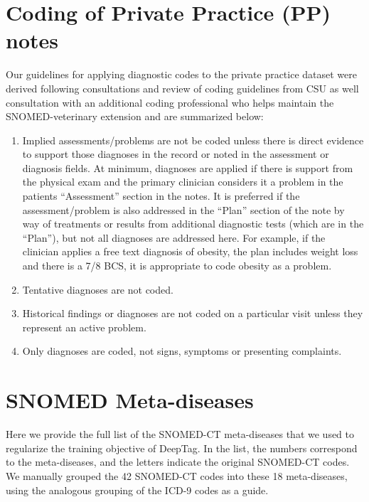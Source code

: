 \documentclass{article}[11pt,oneside]
\begin{document}
\section{Coding of Private Practice (PP) notes}

Our guidelines for applying diagnostic codes to the private practice dataset were derived following consultations and review of coding guidelines from CSU as well consultation with an additional coding professional who helps maintain the SNOMED-veterinary extension and are summarized below:

\begin{enumerate}

\item Implied assessments/problems are not be coded unless there is direct evidence to support those diagnoses in the record or noted in the assessment or diagnosis fields. At minimum, diagnoses are applied if there is support from the physical exam and the primary clinician considers it a problem in the patients “Assessment” section in the notes.  It is preferred if the assessment/problem is also addressed in the “Plan” section of the note by way of treatments or results from additional diagnostic tests (which are in the “Plan”), but not all diagnoses are addressed here. For example, if the clinician applies a free text diagnosis of obesity, the plan includes weight loss and there is a 7/8 BCS, it is appropriate to code obesity as a problem.

\item Tentative diagnoses are not coded.

\item Historical findings or diagnoses are not coded on a particular visit unless they represent an active problem.

\item Only diagnoses are coded, not signs, symptoms or presenting complaints.
\end{enumerate}

\section{SNOMED Meta-diseases}

Here we provide the full list of the SNOMED-CT meta-diseases that we used to regularize the training objective of DeepTag. In the list, the numbers correspond to the meta-diseases, and the letters indicate the original SNOMED-CT codes. We manually grouped the 42 SNOMED-CT codes into these 18 meta-diseases, using the analogous grouping of the ICD-9 codes as a guide. 
\end{document}
